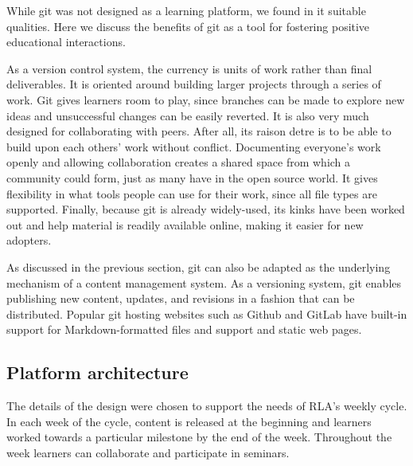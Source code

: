 \documentclass[12pt,twoside,vi]{mitthesis}
\begin{document}
While git was not designed as a learning platform, we found in it suitable qualities. Here we discuss the benefits of git as a tool for fostering positive educational interactions.

As a version control system, the currency is units of work rather than final deliverables. It is oriented around building larger projects through a series of work. Git gives learners room to play, since branches can be made to explore new ideas and unsuccessful changes can be easily reverted. It is also very much designed for collaborating with peers. After all, its raison detre is to be able to build upon each others’ work without conflict. Documenting everyone’s work openly and allowing collaboration creates a shared space from which a community could form, just as many have in the open source world. It gives flexibility in what tools people can use for their work, since all file types are supported. Finally, because git is already widely-used, its kinks have been worked out and help material is readily available online, making it easier for new adopters.

As discussed in the previous section, git can also be adapted as the underlying mechanism of a content management system. As a versioning system, git enables publishing new content, updates, and revisions in a fashion that can be distributed. Popular git hosting websites such as Github and GitLab have built-in support for Markdown-formatted files and support and static web pages.

\subsection{Platform architecture}

The details of the design were chosen to support the needs of RLA’s weekly cycle. In each week of the cycle, content is released at the beginning and learners worked towards a particular milestone by the end of the week. Throughout the week learners can collaborate and participate in seminars.
\end{document}
